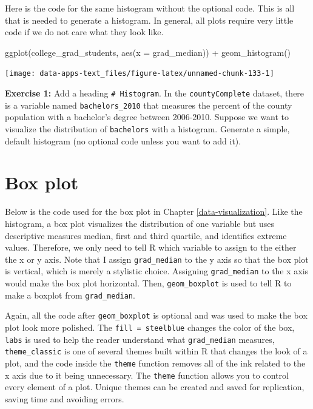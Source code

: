 \documentclass[
]{book}
\makeatletter
\newenvironment{Shaded}{\begin{snugshade}}{\end{snugshade}}
\newcommand{\AttributeTok}[1]{\textcolor[rgb]{0.61,0.61,0.61}{#1}}
\newcommand{\FunctionTok}[1]{\textcolor[rgb]{0,0,0}{#1}}
\newcommand{\NormalTok}[1]{#1}
\newcommand{\SpecialCharTok}[1]{\textcolor[rgb]{0,0,0}{#1}}
\newenvironment{kframe}{%
\medskip{}
\setlength{\fboxsep}{.8em}
 \def\at@end@of@kframe{}%
 \ifinner\ifhmode%
  \def\at@end@of@kframe{\end{minipage}}%
  \begin{minipage}{\columnwidth}%
 \fi\fi%
 \def\FrameCommand##1{\hskip\@totalleftmargin \hskip-\fboxsep
 \colorbox{shadecolor}{##1}\hskip-\fboxsep
     \hskip-\linewidth \hskip-\@totalleftmargin \hskip\columnwidth}%
 \MakeFramed {\advance\hsize-\width
   \@totalleftmargin\z@ \linewidth\hsize
   \@setminipage}}%
 {\par\unskip\endMakeFramed%
 \at@end@of@kframe}
\renewenvironment{Shaded}{\begin{kframe}}{\end{kframe}}
\newenvironment{rmdblock}[1]
  {\begin{shaded*}
  }
  {\end{shaded*}
  }
\newenvironment{learncheck}
  {\begin{rmdblock}{warning}}
  {\end{rmdblock}}
\makeatother
\begin{document}
Here is the code for the same histogram without the optional code. This is all that is needed to generate a histogram. In general, all plots require very little code if we do not care what they look like.

\begin{Shaded}
\begin{Highlighting}[]
\FunctionTok{ggplot}\NormalTok{(college\_grad\_students, }\FunctionTok{aes}\NormalTok{(}\AttributeTok{x =}\NormalTok{ grad\_median)) }\SpecialCharTok{+}
  \FunctionTok{geom\_histogram}\NormalTok{()}
\end{Highlighting}
\end{Shaded}

\begin{center}\texttt{[image: data-apps-text\_files/figure-latex/unnamed-chunk-133-1]} \end{center}

\begin{learncheck}
\textbf{Exercise 1:} Add a heading \texttt{\#\ Histogram}. In the
\texttt{countyComplete} dataset, there is a variable named
\texttt{bachelors\_2010} that measures the percent of the county
population with a bachelor's degree between 2006-2010. Suppose we want
to visualize the distribution of \texttt{bachelors} with a histogram.
Generate a simple, default histogram (no optional code unless you want
to add it).
\end{learncheck}

\hypertarget{box-plot}{%
\section{Box plot}\label{box-plot}}

Below is the code used for the box plot in Chapter \ref{data-visualization}. Like the histogram, a box plot visualizes the distribution of one variable but uses descriptive measures median, first and third quartile, and identifies extreme values. Therefore, we only need to tell R which variable to assign to the either the x or y axis. Note that I assign \texttt{grad\_median} to the y axis so that the box plot is vertical, which is merely a stylistic choice. Assigning \texttt{grad\_median} to the x axis would make the box plot horizontal. Then, \texttt{geom\_boxplot} is used to tell R to make a boxplot from \texttt{grad\_median}.

Again, all the code after \texttt{geom\_boxplot} is optional and was used to make the box plot look more polished. The \texttt{fill\ =\ \textquotesingle{}steelblue\textquotesingle{}} changes the color of the box, \texttt{labs} is used to help the reader understand what \texttt{grad\_median} measures, \texttt{theme\_classic} is one of several themes built within R that changes the look of a plot, and the code inside the \texttt{theme} function removes all of the ink related to the x axis due to it being unnecessary. The \texttt{theme} function allows you to control every element of a plot. Unique themes can be created and saved for replication, saving time and avoiding errors.
\end{document}

